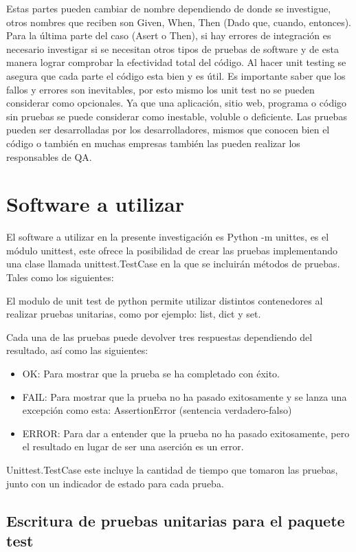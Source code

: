 \documentclass[conference]{IEEEtran}
\begin{document}
Estas partes pueden cambiar de nombre dependiendo de donde se investigue, otros nombres que reciben son Given, When, Then (Dado que, cuando, entonces).
Para la última parte del caso (Asert o Then), si hay errores de integración es necesario investigar si se necesitan otros tipos de pruebas de software y de esta manera lograr comprobar la efectividad total del código.
Al hacer unit testing se asegura que cada parte el código esta bien y es útil. Es importante saber que los fallos y errores son inevitables, por esto mismo los unit test no se pueden considerar como opcionales. Ya que una aplicación, sitio web, programa o código sin pruebas se puede considerar como inestable, voluble o deficiente.
Las pruebas pueden ser desarrolladas por los desarrolladores, mismos que conocen bien el código o también en muchas empresas también las pueden realizar los responsables de QA.

\section{Software a utilizar}

El software a utilizar en la presente investigación es Python -m unittes, es el módulo unittest, este ofrece la posibilidad de crear las pruebas implementando una clase llamada unittest.TestCase en la que se incluirán métodos de pruebas. Tales como los siguientes: 

El modulo de unit test de python permite utilizar distintos contenedores al realizar pruebas unitarias, como por ejemplo: list, dict y set.

Cada una de las pruebas puede devolver tres respuestas dependiendo del resultado, así como las siguientes:

\begin{itemize}
\item OK: Para mostrar que la prueba se ha completado con éxito.
\item FAIL: Para mostrar que la prueba no ha pasado exitosamente y se lanza una excepción como esta: AssertionError (sentencia verdadero-falso)
\item ERROR: Para dar a entender que la prueba no ha pasado exitosamente, pero el resultado en lugar de ser una aserción es un error.
\end{itemize}

Unittest.TestCase este incluye la cantidad de tiempo que tomaron las pruebas, junto con un indicador de estado para cada prueba. 

\subsection{Escritura de pruebas unitarias para el paquete test}
\end{document}
